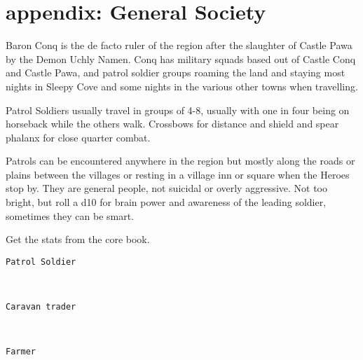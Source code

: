 \newpage
\section*{appendix: General Society}

\raggedbottom

Baron Conq is the de facto ruler of the region after the slaughter of Castle Pawa by the Demon Uchly Namen. Conq has military squads based out of Castle Conq and Castle Pawa, and patrol soldier groups roaming the land and staying most nights in Sleepy Cove and some nights in the various other towns when travelling.

Patrol Soldiers usually travel in groups of 4-8, usually with one in four being on horseback while the others walk. Crossbows for distance and shield and spear phalanx for close quarter combat.

Patrols can be encountered anywhere in the region but mostly along the roads or plains between the villages or resting in a village inn or square when the Heroes stop by. They are general people, not suicidal or overly aggressive. Not too bright, but roll a d10 for brain power and awareness of the leading soldier, sometimes they can be smart.

Get the stats from the core book.

\goodbreak \small \begin{samepage} \begin{verbatim}
Patrol Soldier
\end{verbatim} \end{samepage} \normalsize

\

\goodbreak \small \begin{samepage} \begin{verbatim}
Caravan trader
\end{verbatim} \end{samepage} \normalsize

\

\goodbreak \small \begin{samepage} \begin{verbatim}
Farmer
\end{verbatim} \end{samepage} \normalsize

